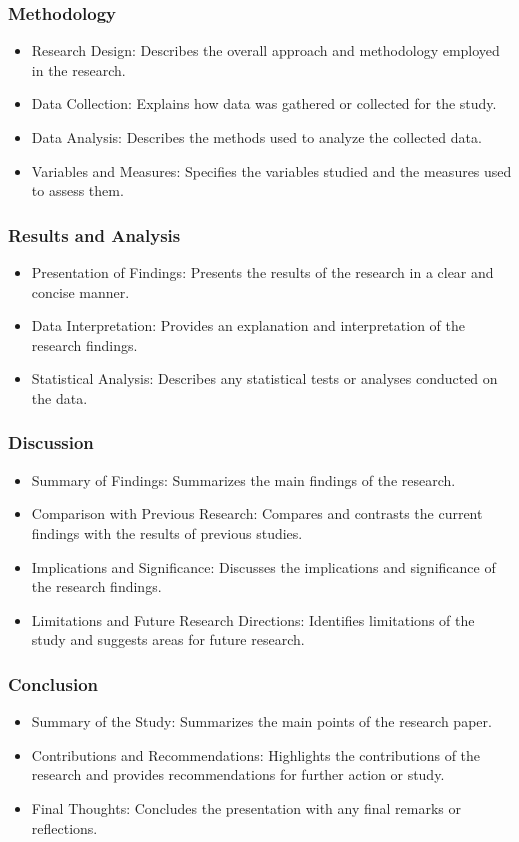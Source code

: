 \documentclass[%
  beameroptions={ignorenonframetext,11pt,169},
  articleoptions={11pt},
  also={trans,handout,article},
  ]{beamerswitch}
\begin{document}
\begin{frame}
  \frametitle{Methodology}
  \setcounter{footnote}{0}
  \setcounter{equation}{0}
  \begin{itemize}
    \item Research Design: Describes the overall approach and methodology employed in the research.
    \item Data Collection: Explains how data was gathered or collected for the study.
    \item Data Analysis: Describes the methods used to analyze the collected data.
    \item Variables and Measures: Specifies the variables studied and the measures used to assess them.
  \end{itemize}
\end{frame}

\begin{frame}
  \frametitle{Results and Analysis}
  \setcounter{footnote}{0}
  \setcounter{equation}{0}
  \begin{itemize}
    \item Presentation of Findings: Presents the results of the research in a clear and concise manner.
    \item Data Interpretation: Provides an explanation and interpretation of the research findings.
    \item Statistical Analysis: Describes any statistical tests or analyses conducted on the data.
  \end{itemize}
\end{frame}

\begin{frame}
  \frametitle{Discussion}
  \setcounter{footnote}{0}
  \setcounter{equation}{0}
  \begin{itemize}
    \item Summary of Findings: Summarizes the main findings of the research.
    \item Comparison with Previous Research: Compares and contrasts the current findings with the results of previous studies.
    \item Implications and Significance: Discusses the implications and significance of the research findings.
    \item Limitations and Future Research Directions: Identifies limitations of the study and suggests areas for future research.
  \end{itemize}
\end{frame}

\begin{frame}
  \frametitle{Conclusion}
  \setcounter{footnote}{0}
  \setcounter{equation}{0}
  \begin{itemize}
    \item Summary of the Study: Summarizes the main points of the research paper.
    \item Contributions and Recommendations: Highlights the contributions of the research and provides recommendations for further action or study.
    \item Final Thoughts: Concludes the presentation with any final remarks or reflections.
  \end{itemize}
\end{frame}
\end{document}
